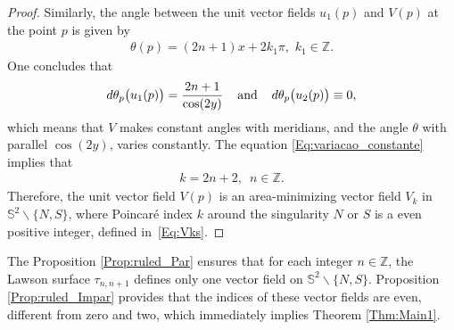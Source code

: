\documentclass[reqno,11pt]{amsart}
\begin{document}
{\begin{proof}
\noindent Similarly, the angle between the unit vector fields $u_1(p)$ and $V(p)$ at the point $p$ is given by
\begin{eqnarray*}
    \theta(p) = (2n+1)x + 2k_1\pi, \, \, k_1 \in \mathbb{Z}.
 \end{eqnarray*}
One concludes that
\begin{eqnarray*}
d\theta_p\big(u_1(p)\big) = \frac{2n+1}{\cos(2y)} \hspace{0.4cm}\mbox{and} \hspace{0.4cm} d\theta_p\big(u_2(p)\big) \equiv 0,
\end{eqnarray*}
which means that $V$ makes constant angles with meridians, and the angle $\theta$ with parallel $\cos(2y)$, varies constantly. The equation \eqref{Eq:variacao_constante} implies that 
\begin{eqnarray*}
 k = 2n+2, \,  \, \, n \in \mathbb{Z}.
\end{eqnarray*}
Therefore, the unit vector field $V(p)$ is an area-minimizing vector field $V_k$ in $\mathbb{S}^2\backslash\{N,S\}$, where Poincaré index $k$ around the singularity $N$ or $S$  is a even positive integer, defined in~\eqref{Eq:Vks}.
\end{proof}


\noindent 

The Proposition \ref{Prop:ruled_Par} ensures that for each integer $n \in \mathbb{Z}$, the Lawson surface $\tau_{n,n+1}$ defines only one vector field on $\mathbb{S}^2\backslash\{N,S\}$. Proposition \ref{Prop:ruled_Impar} provides that the indices of these vector fields are even, different from zero and two, which immediately implies Theorem \ref{Thm:Main1}.




}
\end{document}
